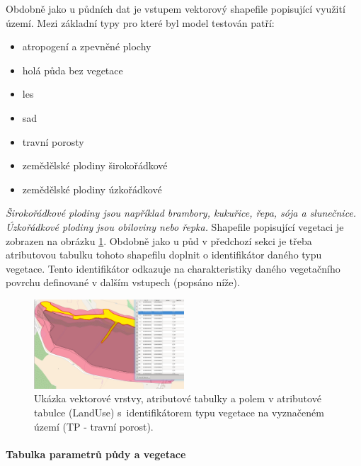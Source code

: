 Obdobně jako u půdních dat je vstupem vektorový shapefile popisující využití území. Mezi základní typy pro které byl model testován patří:
\begin{itemize} \itemsep 0pt
  \item atropogení a zpevněné plochy  
  \item holá půda bez vegetace
  \item les
  \item sad
  \item travní porosty
  \item zemědělské plodiny širokořádkové
  \item zemědělské plodiny úzkořádkové
\end{itemize}

\textit{Širokořádkové plodiny jsou například brambory, kukuřice, řepa, sója a slunečnice. Úzkořádkové plodiny jsou obiloviny nebo řepka.}
Shapefile popisující vegetaci je zobrazen na obrázku \ref{fig:bykovicevegetace}. Obdobně jako u půd v předchozí sekci je třeba atributovou tabulku tohoto shapefilu doplnit o identifikátor daného typu vegetace. Tento identifikátor odkazuje na charakteristiky daného vegetačního povrchu definované v dalším vstupech (popsáno níže).
\begin{figure}
  \centering
  \includegraphics[width=0.5\textwidth]{./img/lu.png}
  \caption{Ukázka vektorové vrstvy, atributové tabulky a polem v atributové tabulce (LandUse) s~identifikátorem typu vegetace na vyznačeném území (TP - travní porost).}
  \label{fig:bykovicevegetace}
\end{figure}



\paragraph{Tabulka parametrů půdy a vegetace}  \label{sec:upravatabulkyparametru}

